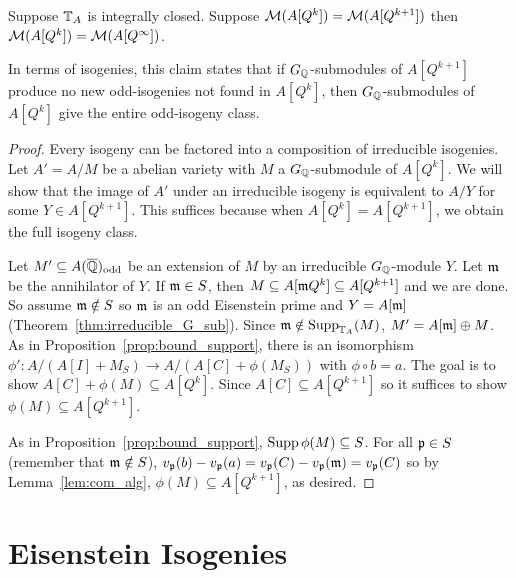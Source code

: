 \documentclass[thesis.tex]{subfiles}
\begin{document}
\begin{proposition}%
    \label{prop:stop_looking}
    Suppose $\mathbb{T}_A$ is integrally closed. Suppose $\mathcal{M}(A[Q^k])=\mathcal{M}(A[Q^{k+1}])$
    then $\mathcal{M}(A[Q^k])=\mathcal{M}(A[Q^\infty])$.

    In terms of isogenies, this claim states that if $G_{\mathbb{Q}}$-submodules of
    $A[Q^{k+1}]$ produce no new odd-isogenies not found in $A[Q^k]$, then
    $G_{\mathbb{Q}}$-submodules of $A[Q^k]$ give the entire odd-isogeny class.
\end{proposition}
\begin{proof}
    Every isogeny can be factored into a composition of irreducible isogenies.
    Let $A'=A/M$ be a abelian variety with $M$ a $G_{\mathbb{Q}}$-submodule of $A[Q^k]$. We
    will show that the image of $A'$ under an irreducible isogeny is equivalent
    to $A/Y$ for some $Y\in A[Q^{k+1}]$. This suffices because when
    $A[Q^k]=A[Q^{k+1}]$, we obtain the full isogeny class.

    Let $M'\subseteq A(\overline{\mathbb{Q}})_{\mathrm{odd}}$ be an extension of $M$ by an irreducible
    $G_{\mathbb{Q}}$-module $Y$. Let $\mathfrak{m}$ be the annihilator of $Y$. If $\mathfrak{m}\in S$, then
    $M\subseteq A[\mathfrak{m} Q^k]\subseteq A[Q^{k+1}]$ and we are done. So assume
    $\mathfrak{m}\notin S$ so $\mathfrak{m}$ is an odd Eisenstein prime and $Y=A[\mathfrak{m}]$
    (Theorem~\ref{thm:irreducible_G_sub}). Since $\mathfrak{m}\notin \operatorname{Supp}_{\mathbb{T}_A}(M)$,
    $M' = A[\mathfrak{m}]\oplus M$. As in Proposition~\ref{prop:bound_support}, there is
    an isomorphism $\phi':A/(A[I]+M_S)\to A/(A[C]+\phi(M_S))$ with $\phi\circ b
    = a$. The goal is to show $A[C]+\phi(M)\subseteq A[Q^k]$. Since
    $A[C]\subseteq A[Q^{k+1}]$ so it suffices to show $\phi(M)\subseteq
    A[Q^{k+1}]$.

    As in Proposition~\ref{prop:bound_support}, $\operatorname{Supp}\phi(M)\subseteq S$. For all
    $\mathfrak{p}\in S$ (remember that $\mathfrak{m} \notin S$), $v_{\mathfrak{p}}(b)-v_{\mathfrak{p}}(a) =
    v_{\mathfrak{p}}(C)-v_{\mathfrak{p}}(\mathfrak{m})=v_{\mathfrak{p}}(C)$ so by Lemma~\ref{lem:com_alg},
    $\phi(M)\subseteq A[Q^{k+1}]$, as desired.
\end{proof}

\section{Eisenstein Isogenies}%
\label{sec:eisenstein_isogenies}
\end{document}

